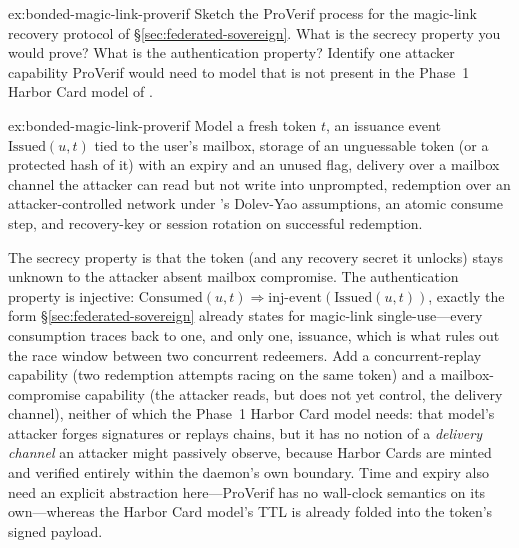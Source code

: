 \documentclass[11pt,a4paper]{article}
\theoremstyle{definition}
\theoremstyle{remark}
\begin{document}
\begin{pdexercise}[kind=Trace,rating=2]{ex:bonded-magic-link-proverif}
Sketch the ProVerif process for the magic-link recovery protocol of \S\ref{sec:federated-sovereign}. What is the secrecy property you would prove? What is the authentication property? Identify one attacker capability ProVerif would need to model that is not present in the Phase~1 Harbor Card model of .
\end{pdexercise}
\begin{pdsolution}{ex:bonded-magic-link-proverif}
Model a fresh token $t$, an issuance event $\mathrm{Issued}(u,t)$ tied to the user's mailbox, storage of an unguessable token (or a protected hash of it) with an expiry and an unused flag, delivery over a mailbox channel the attacker can read but not write into unprompted, redemption over an attacker-controlled network under 's Dolev-Yao assumptions, an atomic consume step, and recovery-key or session rotation on successful redemption.

The secrecy property is that the token (and any recovery secret it unlocks) stays unknown to the attacker absent mailbox compromise. The authentication property is injective: $\mathrm{Consumed}(u,t) \Rightarrow \mathrm{inj\text{-}event}(\mathrm{Issued}(u,t))$, exactly the form \S\ref{sec:federated-sovereign} already states for magic-link single-use---every consumption traces back to one, and only one, issuance, which is what rules out the race window between two concurrent redeemers. Add a concurrent-replay capability (two redemption attempts racing on the same token) and a mailbox-compromise capability (the attacker reads, but does not yet control, the delivery channel), neither of which the Phase~1 Harbor Card model needs: that model's attacker forges signatures or replays chains, but it has no notion of a \emph{delivery channel} an attacker might passively observe, because Harbor Cards are minted and verified entirely within the daemon's own boundary. Time and expiry also need an explicit abstraction here---ProVerif has no wall-clock semantics on its own---whereas the Harbor Card model's TTL is already folded into the token's signed payload.
\end{pdsolution}
\end{document}
